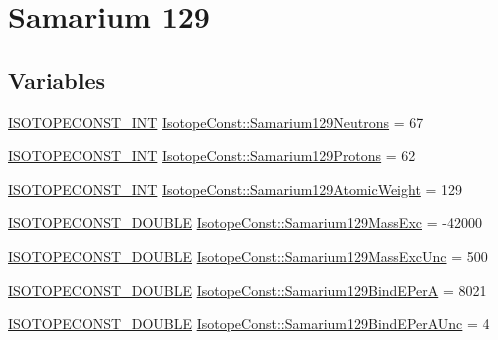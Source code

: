 \hypertarget{group___isotope_const-_samarium-_sm129}{}\section{Samarium 129}
\label{group___isotope_const-_samarium-_sm129}
\subsection*{Variables}
\begin{DoxyCompactItemize}
\item 
\mbox{\hyperlink{group___isotope_const-_macros_ga5f18360b3e99483a35c32d789e62621c}{I\+S\+O\+T\+O\+P\+E\+C\+O\+N\+S\+T\+\_\+\+I\+NT}} \mbox{\hyperlink{group___isotope_const-_samarium-_sm129_gafc47fc56a60d19de1e0c624530ca49be}{Isotope\+Const\+::\+Samarium129\+Neutrons}} = 67
\item 
\mbox{\hyperlink{group___isotope_const-_macros_ga5f18360b3e99483a35c32d789e62621c}{I\+S\+O\+T\+O\+P\+E\+C\+O\+N\+S\+T\+\_\+\+I\+NT}} \mbox{\hyperlink{group___isotope_const-_samarium-_sm129_gad04a379086f9b1bcee7dba5e893584ea}{Isotope\+Const\+::\+Samarium129\+Protons}} = 62
\item 
\mbox{\hyperlink{group___isotope_const-_macros_ga5f18360b3e99483a35c32d789e62621c}{I\+S\+O\+T\+O\+P\+E\+C\+O\+N\+S\+T\+\_\+\+I\+NT}} \mbox{\hyperlink{group___isotope_const-_samarium-_sm129_gaaef8cef7a542f6e0c1012222b080ecb9}{Isotope\+Const\+::\+Samarium129\+Atomic\+Weight}} = 129
\item 
\mbox{\hyperlink{group___isotope_const-_macros_ga8f45a7272ce02c0b4c65c44636ed719a}{I\+S\+O\+T\+O\+P\+E\+C\+O\+N\+S\+T\+\_\+\+D\+O\+U\+B\+LE}} \mbox{\hyperlink{group___isotope_const-_samarium-_sm129_ga1ced3083558f30e41c3567e7f0b0fc36}{Isotope\+Const\+::\+Samarium129\+Mass\+Exc}} = -\/42000
\item 
\mbox{\hyperlink{group___isotope_const-_macros_ga8f45a7272ce02c0b4c65c44636ed719a}{I\+S\+O\+T\+O\+P\+E\+C\+O\+N\+S\+T\+\_\+\+D\+O\+U\+B\+LE}} \mbox{\hyperlink{group___isotope_const-_samarium-_sm129_ga11c653950a2c678aaf7892d33b8ee8ad}{Isotope\+Const\+::\+Samarium129\+Mass\+Exc\+Unc}} = 500
\item 
\mbox{\hyperlink{group___isotope_const-_macros_ga8f45a7272ce02c0b4c65c44636ed719a}{I\+S\+O\+T\+O\+P\+E\+C\+O\+N\+S\+T\+\_\+\+D\+O\+U\+B\+LE}} \mbox{\hyperlink{group___isotope_const-_samarium-_sm129_ga62aff41dd3483861cf99ddec274c4ca2}{Isotope\+Const\+::\+Samarium129\+Bind\+E\+PerA}} = 8021
\item 
\mbox{\hyperlink{group___isotope_const-_macros_ga8f45a7272ce02c0b4c65c44636ed719a}{I\+S\+O\+T\+O\+P\+E\+C\+O\+N\+S\+T\+\_\+\+D\+O\+U\+B\+LE}} \mbox{\hyperlink{group___isotope_const-_samarium-_sm129_gafa7583fcba7b45b383c3ab3ba8a07b48}{Isotope\+Const\+::\+Samarium129\+Bind\+E\+Per\+A\+Unc}} = 4

\end{DoxyCompactItemize}
